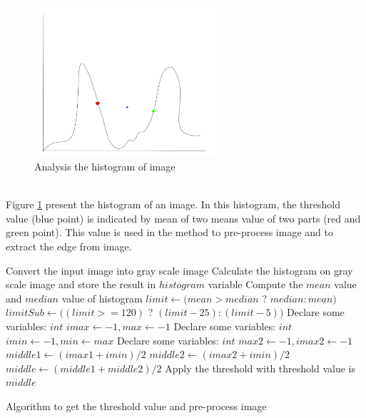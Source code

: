 \begin{figure}[h!]
\centering
\includegraphics[width=0.6\textwidth]{./images/hist}
\caption{Analysis the histogram of image}
\label{fig:32}
\end{figure}~\\
Figure \ref{fig:32} present the histogram of an image. In this histogram, the threshold value (blue point) is indicated by mean of two means value of two parts (red and green point). This value is used in the method to pre-process image and to extract the edge from image.\\
\IncMargin{1em}
\begin{algorithm}[H]
\fontsize{10pt}{10pt}\selectfont
{}
\SetAlgoLined
\Indm 
{}
\Indp
Convert the input image into gray scale image\;
Calculate the histogram on gray scale image and store the result in $histogram$ variable \;
Compute the $mean$ value and $median$ value of histogram\;
$limit \leftarrow (mean > median$ ? $median : mean)$\;
$limitSub \leftarrow ((limit >= 120)$ ? $(limit - 25) : (limit - 5))$\;
Declare some variables: $int$ $imax \leftarrow -1, max \leftarrow -1$\;
Declare some variables: $int$ $imin \leftarrow -1, min \leftarrow max$\;
Declare some variables: $int$ $max2 \leftarrow -1, imax2 \leftarrow -1$\;
$middle1 \leftarrow (imax1 + imin)/2$ \;
$middle2 \leftarrow (imax2 + imin)/2$ \;
$middle \leftarrow (middle1 + middle2)/2$ \;
Apply the threshold with threshold value is $middle$\;
\caption{Algorithm to get the threshold value and pre-process image}
\label{al_preprocess}
\end{algorithm}
\DecMargin{1em}
